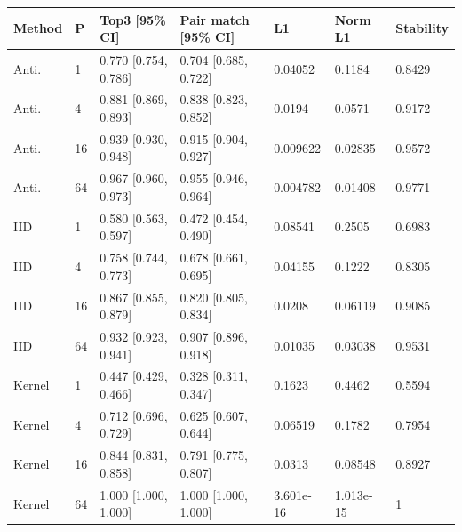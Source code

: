 \begingroup\footnotesize\setlength{\tabcolsep}{3pt}
\begin{tabular}{lllllll}
\toprule
Method & P & Top3 [95\% CI] & Pair match [95\% CI] & L1 & Norm L1 & Stability \\
\midrule
Anti. & 1 & 0.770 [0.754, 0.786] & 0.704 [0.685, 0.722] & 0.04052 & 0.1184 & 0.8429 \\
Anti. & 4 & 0.881 [0.869, 0.893] & 0.838 [0.823, 0.852] & 0.0194 & 0.0571 & 0.9172 \\
Anti. & 16 & 0.939 [0.930, 0.948] & 0.915 [0.904, 0.927] & 0.009622 & 0.02835 & 0.9572 \\
Anti. & 64 & 0.967 [0.960, 0.973] & 0.955 [0.946, 0.964] & 0.004782 & 0.01408 & 0.9771 \\
IID & 1 & 0.580 [0.563, 0.597] & 0.472 [0.454, 0.490] & 0.08541 & 0.2505 & 0.6983 \\
IID & 4 & 0.758 [0.744, 0.773] & 0.678 [0.661, 0.695] & 0.04155 & 0.1222 & 0.8305 \\
IID & 16 & 0.867 [0.855, 0.879] & 0.820 [0.805, 0.834] & 0.0208 & 0.06119 & 0.9085 \\
IID & 64 & 0.932 [0.923, 0.941] & 0.907 [0.896, 0.918] & 0.01035 & 0.03038 & 0.9531 \\
Kernel & 1 & 0.447 [0.429, 0.466] & 0.328 [0.311, 0.347] & 0.1623 & 0.4462 & 0.5594 \\
Kernel & 4 & 0.712 [0.696, 0.729] & 0.625 [0.607, 0.644] & 0.06519 & 0.1782 & 0.7954 \\
Kernel & 16 & 0.844 [0.831, 0.858] & 0.791 [0.775, 0.807] & 0.0313 & 0.08548 & 0.8927 \\
Kernel & 64 & 1.000 [1.000, 1.000] & 1.000 [1.000, 1.000] & 3.601e-16 & 1.013e-15 & 1 \\
\bottomrule
\end{tabular}

\endgroup
